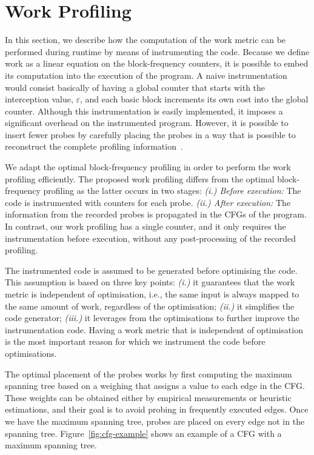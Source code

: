 \section{Work Profiling}

In this section, we describe how the computation of the work metric can be performed during runtime by means of instrumenting the code.
Because we define work as a linear equation on the block-frequency counters, it is possible to embed its computation into the execution of the program.
A naive instrumentation would consist basically of having a global counter that starts with the interception value, $\varepsilon$, and each basic block increments its own cost into the global counter.
Although this instrumentation is easily implemented, it imposes a significant overhead on the instrumented program.
However, it is possible to insert fewer probes by carefully placing the probes in a way that is possible to reconstruct the complete profiling information~\citep{knuth73,ball94}.

We adapt the optimal block-frequency profiling in order to perform the work profiling efficiently.
The proposed work profiling differs from the optimal block-frequency profiling as the latter occurs in two stages:
\textit{(i.) Before execution:} The code is instrumented with counters for each probe.
\textit{(ii.) After execution:} The information from the recorded probes is propagated in the CFGs of the program.
In contrast, our work profiling has a single counter, and it only requires the instrumentation before execution, without any post-processing of the recorded profiling.

The instrumented code is assumed to be generated before optimising the code.
This assumption is based on three key points:
\textit{(i.)} it guarantees that the work metric is independent of optimisation, i.e., the same input is always mapped to the same amount of work, regardless of the optimisation;
\textit{(ii.)} it simplifies the code generator;
\textit{(iii.)} it leverages from the optimisations to further improve the instrumentation code.
Having a work metric that is independent of optimisation is the most important reason for which we instrument the code before optimisations.

The optimal placement of the probes works by first computing the maximum spanning
tree based on a weighing that assigns a value to each edge in the CFG.
These weights can be obtained either by empirical measurements or heuristic estimations,
and their goal is to avoid probing in frequently executed edges.
Once we have the maximum spanning tree, probes are placed on every edge not in the spanning tree.
Figure~\ref{fig:cfg-example} shows an example of a CFG with a maximum spanning tree.

